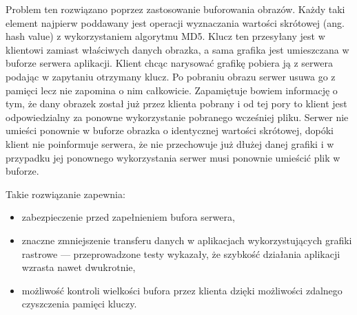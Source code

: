 Problem ten rozwiązano poprzez zastosowanie buforowania obrazów. Każdy taki element najpierw poddawany jest operacji wyznaczania wartości skrótowej (ang. hash value) z wykorzystaniem algorytmu MD5. Klucz ten przesyłany jest w klientowi zamiast właściwych danych obrazka, a sama grafika jest umieszczana w buforze serwera aplikacji. Klient chcąc narysować grafikę pobiera ją z serwera podając w zapytaniu otrzymany klucz. Po pobraniu obrazu serwer usuwa go z pamięci lecz nie zapomina o nim całkowicie. Zapamiętuje bowiem informację o tym, że dany obrazek został już przez klienta pobrany i od tej pory to klient jest odpowiedzialny za ponowne wykorzystanie pobranego wcześniej pliku. Serwer nie umieści ponownie w buforze obrazka o identycznej wartości skrótowej, dopóki klient nie poinformuje serwera, że nie przechowuje już dłużej danej grafiki i w przypadku jej ponownego wykorzystania serwer musi ponownie umieścić plik w buforze. 

Takie rozwiązanie zapewnia:
\begin{itemize}
\item zabezpieczenie przed zapełnieniem bufora serwera,
\item znaczne zmniejszenie transferu danych w aplikacjach wykorzystujących grafiki rastrowe --- przeprowadzone testy wykazały, że szybkość działania aplikacji wzrasta nawet dwukrotnie,
\item możliwość kontroli wielkości bufora przez klienta dzięki możliwości zdalnego czyszczenia pamięci kluczy.
\end{itemize}